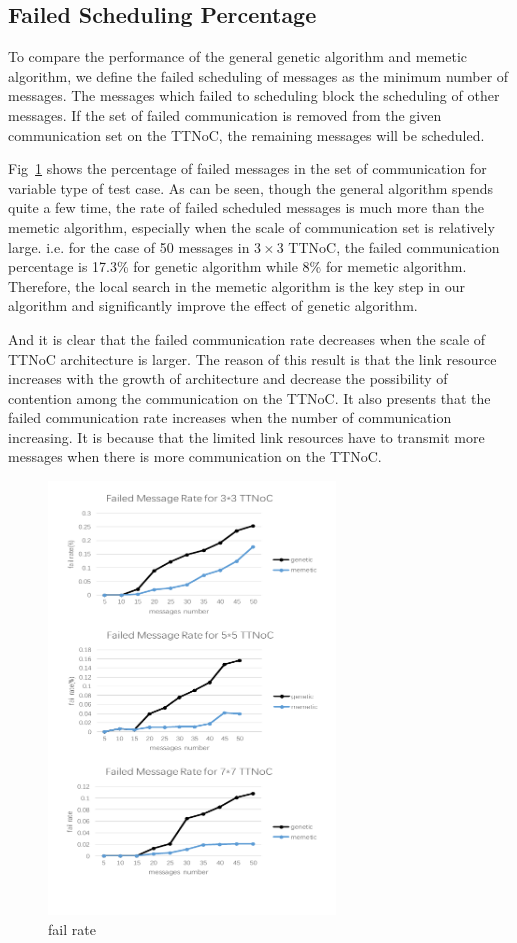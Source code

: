\documentclass[journal]{IEEEtran}
\begin{document}
\subsection{Failed Scheduling Percentage}
To compare the performance of the general genetic algorithm and memetic algorithm,
 we define the failed scheduling of messages as the minimum number of messages.
The messages which failed to scheduling block the scheduling of other messages.
If the set of failed communication is removed from the given communication set on the TTNoC, the remaining messages will be scheduled.

Fig~\ref{f:fail} shows the percentage of failed messages in the set of communication for variable type of test case. 
As can be seen,
 though the general algorithm spends quite a few time,
  the rate of failed scheduled messages is much more than the memetic algorithm, especially when the scale of communication set is relatively large. i.e. for the case of 50 messages in $3\times 3$ TTNoC, the failed communication percentage is 17.3\% for genetic algorithm while 8\% for memetic algorithm. Therefore, the local search in the memetic algorithm is the key step in our algorithm and significantly improve the effect of genetic algorithm.

And it is clear that the failed communication rate decreases when the scale of TTNoC architecture is larger. The reason of this result is that the link resource increases with the growth of architecture and decrease the possibility of contention among the communication on the TTNoC. It also presents that the failed communication rate increases when the number of communication increasing. It is because that the limited link resources have to transmit more messages when there is more communication on the TTNoC.
\begin{figure}[!t]
	\centering
	\includegraphics[width=3in]{picture/rate}
	\caption{fail rate}
	\label{f:fail}
\end{figure}
\end{document}
